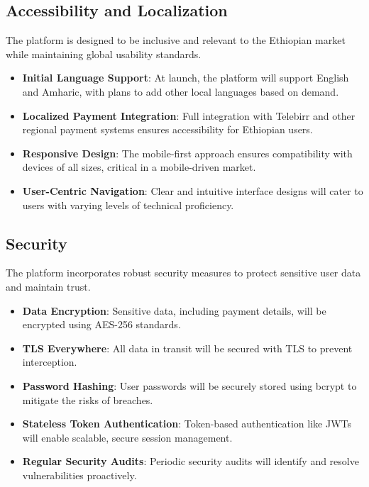 \documentclass[12pt]{report}
\begin{document}
\subsection{Accessibility and Localization}

The platform is designed to be inclusive and relevant to the Ethiopian market while
maintaining global usability standards.

\begin{itemize}
	\item \textbf{Initial Language Support}: At launch, the platform will support English and
	      Amharic, with plans to add other local languages based on demand.
	\item \textbf{Localized Payment Integration}: Full integration with Telebirr and other regional
	      payment systems ensures accessibility for Ethiopian users.
	\item \textbf{Responsive Design}: The mobile-first approach ensures compatibility with devices of
	      all sizes, critical in a mobile-driven market.
	\item \textbf{User-Centric Navigation}: Clear and intuitive interface designs will cater to users
	      with varying levels of technical proficiency.
\end{itemize}

\subsection{Security}

The platform incorporates robust security measures to protect sensitive user data and
maintain trust.

\begin{itemize}
	\item \textbf{Data Encryption}: Sensitive data, including payment details, will be encrypted using
	      AES-256 standards.
	\item \textbf{TLS Everywhere}: All data in transit will be secured with TLS to prevent
	      interception.
	\item \textbf{Password Hashing}: User passwords will be securely stored using bcrypt to mitigate
	      the risks of breaches.
	\item \textbf{Stateless Token Authentication}: Token-based authentication like JWTs will enable
	      scalable, secure session management.
	\item \textbf{Regular Security Audits}: Periodic security audits will identify and resolve
	      vulnerabilities proactively.
\end{itemize}
\end{document}

